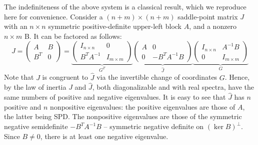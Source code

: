 \documentclass[11pt]{article}
\begin{document}
The indefiniteness of the above system is a classical result, which we reproduce here for convenience.
Consider a $(n+m)\times (n+m)$ saddle-point matrix $J$ with an $n\times n$ symmetric positive-definite upper-left block $A$,
and a nonzero $n\times m$ B.  It can be factored as follows:
$$
  J = \begin{pmatrix} A & B\\ B^T & 0 \end{pmatrix} =
  \underbrace{\begin{pmatrix} I_{n\times n} & 0\\ B^T A^{-1} & I_{m \times m}\end{pmatrix}}_{G^T}
  \underbrace{\begin{pmatrix} A & 0\\ 0 & -B^T A^{-1} B \end{pmatrix}}_{\hat J}
  \underbrace{\begin{pmatrix} I_{n\times n} & A^{-1} B\\ 0 & I_{m \times m}\end{pmatrix}}_{G}
$$
Note that $J$ is congruent to $\hat J$ via the invertible change of coordinates $G$.
Hence, by the law of inertia $J$ and $\hat J$, both diagonalizable and with real spectra, have the same numbers of positive and negative eigenvalues.
It is easy to see that $\hat J$ has $n$ positive and $n$ nonpositive eigenvalues: the positive eigenvalues are those of $A$, the latter being SPD.
The nonpositive eigenvalues are those of the symmetric negative semidefinite $-B^TA^{-1} B$ -- symmetric negative definite on $(\ker{B})^\perp$.
Since $B \neq 0$, there is at least one negative eigenvalue.
\end{document}
